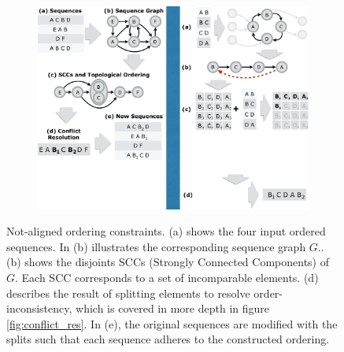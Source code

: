 \begin{figure}[t!] 
\begin{minipage}{1\linewidth}
\begin{subfigure}[c]{0.96\linewidth}
\includegraphics[trim={0 6cm 19.2cm 0}, clip, width=\linewidth]{figures/partial_ordering}
\end{subfigure} 
\end{minipage} 
\caption{Not-aligned ordering constraints. (a) shows the four input ordered sequences. In (b) illustrates the corresponding sequence graph $G$.. (b) shows the disjoints SCCs  (Strongly Connected Components) of $G$. Each SCC corresponds to a set of incomparable elements. (d) describes the result of splitting elements to resolve order-inconsistency, which is covered in more depth in figure \ref{fig:conflict_res}. In (e), the original sequences are modified with the splits such that each sequence adheres to the constructed ordering.}
\label{fig:ordering}
\end{figure}



